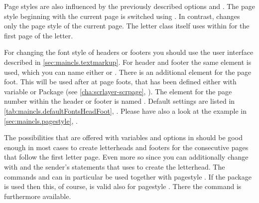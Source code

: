 Page styles are also influenced by the previously described
options
 and
. The page style beginning with
the current page is switched using . In contrast,
 changes only the page style of the current
page. The letter class itself uses
 within
 for the first page of the letter.

\BeginIndexGroup
{}%
%
%
%
For changing the font style of headers or footers you should use the user
interface described in \autoref{sec:maincls.textmarkup}.  For header and
footer the same element is used, which you can name either
 or
.  There is an
additional element 
for the page foot. This will be used after  at page
foots, that has been defined either with variable
 or Package
 (see
\autoref{cha:scrlayer-scrpage},
). The element for the
page number within the header or footer is named
. Default settings
are listed in \autoref{tab:maincls.defaultFontsHeadFoot},
.  Please have also a look at
the example in \autoref{sec:maincls.pagestyle},
.
%
\EndIndexGroup
%
\EndIndexGroup


\begin{Declaration}
\end{Declaration}
The possibilities that are offered with variables and options in
 should be good enough in most cases to create letterheads and
footers for the consecutive pages that follow the first letter page. Even more
so since you can additionally change with  and
 the sender's statements that  uses to create
the letterhead. The commands  and
 can in particular be used together with
pagestyle %
. If the package
 is used then this,
of course, is valid also for pagestyle
. There the command
 is furthermore available.

